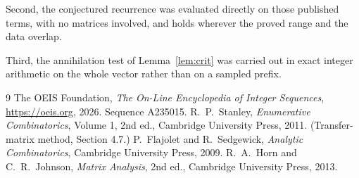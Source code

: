 \documentclass[11pt,a4paper]{article}
\theoremstyle{plain}
\theoremstyle{definition}
\begin{document}
Second, the conjectured recurrence was evaluated directly on those published terms, with no
matrices involved, and holds wherever the proved range and the data overlap.

Third, the annihilation test of Lemma~\ref{lem:crit} was carried out in exact integer
arithmetic on the whole vector rather than on a sampled prefix.

\begin{thebibliography}{9}
 The OEIS Foundation, \emph{The On-Line Encyclopedia of Integer
Sequences}, \url{https://oeis.org}, 2026. Sequence A235015.
 R.~P.~Stanley, \emph{Enumerative Combinatorics}, Volume 1, 2nd ed.,
Cambridge University Press, 2011. (Transfer-matrix method, Section 4.7.)
 P.~Flajolet and R.~Sedgewick, \emph{Analytic Combinatorics}, Cambridge
University Press, 2009.
 R.~A.~Horn and C.~R.~Johnson, \emph{Matrix Analysis}, 2nd ed., Cambridge
University Press, 2013.
\end{thebibliography}
\end{document}
